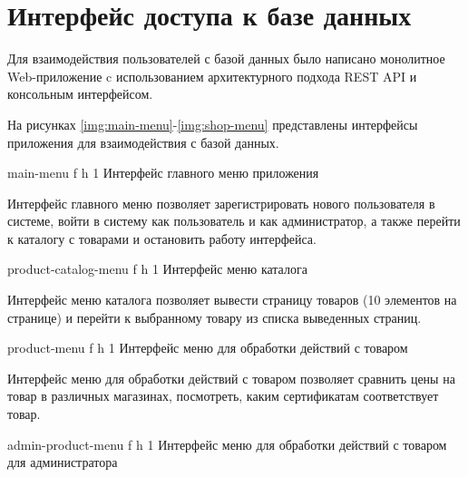 \section{Интерфейс доступа к базе данных}

Для взаимодействия пользователей с базой данных было написано монолитное Web-приложение c использованием архитектурного подхода REST API \cite{info_rest_api} и консольным интерфейсом.

На рисунках \ref{img:main-menu}-\ref{img:shop-menu} представлены интерфейсы приложения для взаимодействия с базой данных.

{main-menu} %
{f} %
{h} %
{1\textwidth} %
{Интерфейс главного меню приложения} %

Интерфейс главного меню позволяет зарегистрировать нового пользователя в системе, войти в систему как пользователь и как администратор, а также перейти к каталогу с товарами и остановить работу интерфейса.

{product-catalog-menu} %
{f} %
{h} %
{1\textwidth} %
{Интерфейс меню каталога} %

Интерфейс меню каталога позволяет вывести страницу товаров (10 элементов на странице) и перейти к выбранному товару из списка выведенных страниц.

\clearpage

{product-menu} %
{f} %
{h} %
{1\textwidth} %
{Интерфейс меню для обработки действий с товаром} %

Интерфейс меню для обработки действий с товаром позволяет сравнить цены на товар в  различных магазинах, посмотреть, каким сертификатам соответствует товар.

{admin-product-menu} %
{f} %
{h} %
{1\textwidth} %
{Интерфейс меню для обработки действий с товаром для администратора} %

